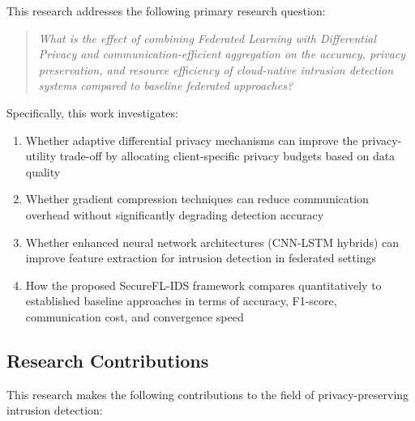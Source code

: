 This research addresses the following primary research question:

\begin{quote}
\textit{What is the effect of combining Federated Learning with Differential Privacy and communication-efficient aggregation on the accuracy, privacy preservation, and resource efficiency of cloud-native intrusion detection systems compared to baseline federated approaches?}
\end{quote}

Specifically, this work investigates:

\begin{enumerate}
    \item Whether adaptive differential privacy mechanisms can improve the privacy-utility trade-off by allocating client-specific privacy budgets based on data quality
    \item Whether gradient compression techniques can reduce communication overhead without significantly degrading detection accuracy
    \item Whether enhanced neural network architectures (CNN-LSTM hybrids) can improve feature extraction for intrusion detection in federated settings
    \item How the proposed SecureFL-IDS framework compares quantitatively to established baseline approaches in terms of accuracy, F1-score, communication cost, and convergence speed
\end{enumerate}

\subsection{Research Contributions}

This research makes the following contributions to the field of privacy-preserving intrusion detection:

